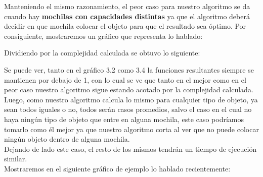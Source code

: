 Manteniendo el mismo razonamiento, el peor caso para nuestro algoritmo se da cuando hay \textbf{mochilas con capacidades distintas} ya que el algoritmo deber\'a decidir en que mochila colocar el objeto para que el resultado sea \'optimo. Por consiguiente, mostraremos un gr\'afico que representa lo hablado:\\

\vspace*{0.3cm} \vspace*{0.3cm}
  \begin{center}
  \end{center}
  \vspace*{0.3cm}

Dividiendo por la complejidad calculada se obtuvo lo siguiente:\\

\vspace*{0.3cm} \vspace*{0.3cm}
  \begin{center}
  \end{center}
  \vspace*{0.3cm}
  
Se puede ver, tanto en el gr\'afico 3.2 como 3.4 la funciones resultantes siempre se mantienen por debajo de 1, con lo cual se ve que tanto en el mejor como en el peor caso nuestro algoritmo sigue estando acotado por la complejidad calculada.\\

Luego, como nuestro algoritmo calcula lo mismo para cualquier tipo de objeto, ya sean todos iguales o no, todos ser\'an casos promedios, salvo el caso en el cual no haya ning\'un tipo de objeto que entre en alguna mochila, este caso podr\'iamos tomarlo como \'el mejor ya que nuestro algoritmo corta al ver que no puede colocar ning\'un objeto dentro de alguna mochila.\\
Dejando de lado este caso, el resto de los mismos tendr\'an un tiempo de ejecuci\'on similar.\\

Mostraremos en el siguiente gr\'afico de ejemplo lo hablado recientemente:\\

